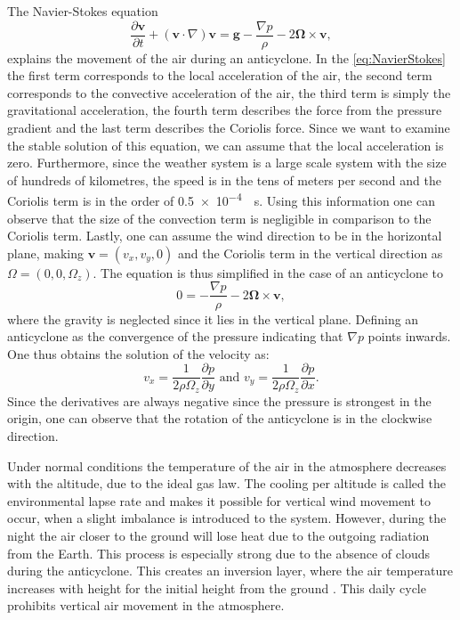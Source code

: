 The Navier-Stokes equation
\begin{equation} \frac{\partial \mathbf{v}}{\partial t} + (\mathbf{v} \cdot \nabla)\mathbf{v} = \mathbf{g} - \frac{\nabla p}{\rho} - 2\boldsymbol{\Omega} \times \mathbf{v}, \label{eq:NavierStokes} \end{equation}
explains the movement of the air during an anticyclone. In the \autoref{eq:NavierStokes} the first term corresponds to the local acceleration of the air, the second term corresponds to the convective acceleration of the air, the third term is simply the gravitational acceleration, the fourth term describes the force from the pressure gradient and the last term describes the Coriolis force. Since we want to examine the stable solution of this equation, we can assume that the local acceleration is zero. Furthermore, since the weather system is a large scale system with the size of hundreds of kilometres, the speed is in the tens of meters per second and the Coriolis term is in the order of \SI{0.5e-4}{\per\s}. Using this information one can observe that the size of the convection term is negligible in comparison to the Coriolis term. Lastly, one can assume the wind direction to be in the horizontal plane, making $\mathbf{v}=(v_x,v_y,0)$ and the Coriolis term in the vertical direction as $\Omega=(0,0,\Omega_z)$. The equation is thus simplified in the case of an anticyclone to
\begin{equation} 0 = - \frac{\nabla p}{\rho} - 2\boldsymbol{\Omega} \times \mathbf{v}, \label{eq:NavierStokes2} \end{equation}
where the gravity is neglected since it lies in the vertical plane. Defining an anticyclone as the convergence of the pressure indicating that $\nabla p$ points inwards. One thus obtains the solution of the velocity as:
\begin{equation} v_x=\frac{1}{2\rho\Omega_z}\frac{\partial p}{\partial y}\text{ and }v_y=\frac{1}{2\rho\Omega_z}\frac{\partial p}{\partial x}. \end{equation}
Since the derivatives are always negative since the pressure is strongest in the origin, one can observe that the rotation of the anticyclone is in the clockwise direction.

Under normal conditions the temperature of the air in the atmosphere decreases with the altitude, due to the ideal gas law. The cooling per altitude is called the environmental lapse rate and makes it possible for vertical wind movement to occur, when a slight imbalance is introduced to the system. However, during the night the air closer to the ground will lose heat due to the outgoing radiation from the Earth. This process is especially strong due to the absence of clouds during the anticyclone. This creates an inversion layer, where the air temperature increases with height for the initial height from the ground \cite{gregohareWeatherClimateClimate2005}. This daily cycle prohibits vertical air movement in the atmosphere.

